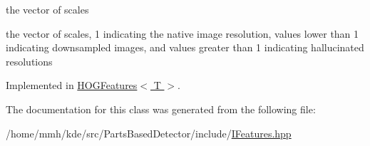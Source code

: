 the vector of scales 

the vector of scales, 1 indicating the native image resolution, values lower than 1 indicating downsampled images, and values greater than 1 indicating hallucinated resolutions 

Implemented in \hyperlink{classHOGFeatures_ad9668fda860881c676e1d1bd70adc18c}{H\-O\-G\-Features$<$ T $>$}.



The documentation for this class was generated from the following file\-:\begin{DoxyCompactItemize}
\item 
/home/mmh/kde/src/\-Parts\-Based\-Detector/include/\hyperlink{IFeatures_8hpp}{I\-Features.\-hpp}\end{DoxyCompactItemize}
